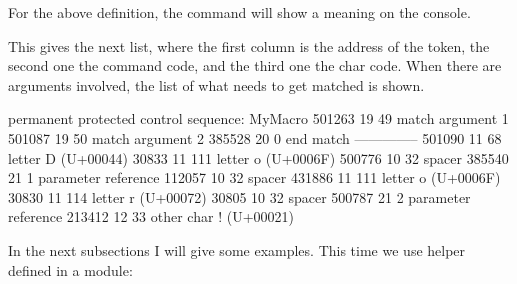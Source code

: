 For the above definition, the \type {\showluatokens} command will show a meaning
on the console.

\starttyping[option=TEX]
\showluatokens\MyMacro
\stoptyping


This gives the next list, where the first column is the address of the token, the
second one the command code, and the third one the char code. When there are
arguments involved, the list of what needs to get matched is shown.

\starttyping
permanent protected control sequence: MyMacro
501263  19   49  match                argument 1
501087  19   50  match                argument 2
385528  20    0  end match
--------------
501090  11   68  letter               D (U+00044)
 30833  11  111  letter               o (U+0006F)
500776  10   32  spacer
385540  21    1  parameter reference
112057  10   32  spacer
431886  11  111  letter               o (U+0006F)
 30830  11  114  letter               r (U+00072)
 30805  10   32  spacer
500787  21    2  parameter reference
213412  12   33  other char           ! (U+00021)
\stoptyping

In the next subsections I will give some examples. This time we use
helper defined in a module:

\starttyping[option=TEX]
\stoptyping

\startsectionlevel[title=Example 1: in the input]

\startbuffer
{}
\stopbuffer

\typebuffer[option=TEX] \blank[line] {\switchtobodyfont[8pt] \getbuffer}

\stopsectionlevel

\startsectionlevel[title=Example 2: in the input]

\startbuffer
{}
\stopbuffer

\typebuffer[option=TEX] \blank[line] {\switchtobodyfont[8pt] \getbuffer}

\stopsectionlevel

\startsectionlevel[title=Example 3: user registers]

\startbuffer
{}

\luatokentable\scratchtoks
\stopbuffer

\typebuffer[option=TEX] \blank[line] {\switchtobodyfont[8pt] \getbuffer}

